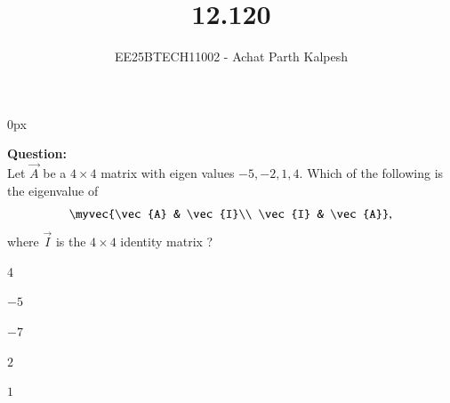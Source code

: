 \documentclass[journal]{IEEEtran}
\begin{document}

\title{12.120}
\author{EE25BTECH11002 - Achat Parth Kalpesh }
{\let\newpage\relax\maketitle}
\renewcommand{\thefigure}{\theenumi}
\renewcommand{\thetable}{\theenumi}
\setlength{\intextsep}{10pt} %
\renewcommand{\thetable}{\theenumi}
\parindent 0px



\textbf{Question:}\\
Let $\vec{A}$ be a $4 \times 4$ matrix with eigen values $-5,-2,1,4 $. Which of the following is the eigenvalue of
\begin{align}
    \myvec{\vec{A} & \vec{I}\\ \vec{I} & \vec{A}},
\end{align} 
where $\vec{I}$ is the $4 \times 4$ identity matrix ?
\begin{enumerate}
	\begin{multicols}{4}
    \item $-5$
    \item $-7$
    \item $2$
    \item $1$
    \end{multicols}
\end{enumerate}
\end{document}

